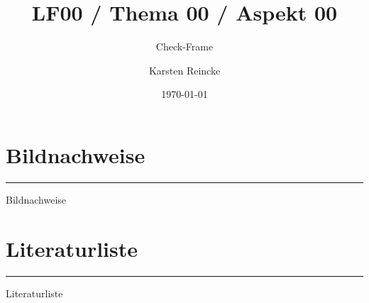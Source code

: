 \documentclass[]{beamer}
\title{LF00 / Thema 00 / Aspekt 00}
\subtitle{Check-Frame}
\institute{GS-LDK}
\author{Karsten Reincke}
\date{\today}
\def\cfgGl{../../../../cfg.gl/}
\begin{document}

\begin{frame}
  \titlepage
\end{frame}







\logo{}
\newpage

\section{Bildnachweise}
\noindent\rule{\linewidth}{0.4pt}

\begin{small}Bildnachweise\end{small}

\vspace{0.22cm}
\begin{tiny}
 
\end{tiny}

\newpage
\section{Literaturliste}
\noindent\rule{\linewidth}{0.4pt}

\begin{small}Literaturliste\end{small}

\vspace{0.22cm}
\printbibliography
\end{document}
